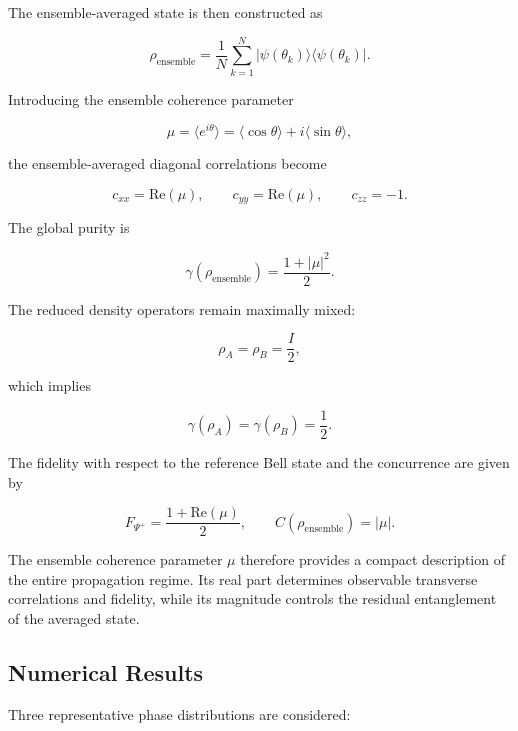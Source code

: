 The ensemble-averaged state is then constructed as

\begin{equation}
\rho_{\mathrm{ensemble}}
=
\frac{1}{N}
\sum_{k=1}^{N}
|\psi(\theta_k)\rangle
\langle\psi(\theta_k)|.
\label{eq:random_phase_ensemble_density_operator}
\end{equation}

Introducing the ensemble coherence parameter

\begin{equation}
\mu
=
\langle e^{i\theta} \rangle
=
\langle \cos\theta \rangle
+
i
\langle \sin\theta \rangle,
\label{eq:ensemble_coherence_parameter}
\end{equation}

the ensemble-averaged diagonal correlations become

\[
c_{xx}
=
\mathrm{Re}(\mu),
\qquad
c_{yy}
=
\mathrm{Re}(\mu),
\qquad
c_{zz}
=
-1.
\]

The global purity is

\[
\gamma(\rho_{\mathrm{ensemble}})
=
\frac{1 + |\mu|^2}{2}.
\]

The reduced density operators remain maximally mixed:

\[
\rho_A
=
\rho_B
=
\frac{I}{2},
\]

which implies

\[
\gamma(\rho_A)
=
\gamma(\rho_B)
=
\frac{1}{2}.
\]

The fidelity with respect to the reference Bell state and the concurrence are given by

\[
F_{\Psi^+}
=
\frac{1 + \mathrm{Re}(\mu)}{2},
\qquad
C(\rho_{\mathrm{ensemble}})
=
|\mu|.
\]

\medskip

The ensemble coherence parameter \( \mu \) therefore provides a compact description of the entire propagation regime. Its real part determines observable transverse correlations and fidelity, while its magnitude controls the residual entanglement of the averaged state.


\subsection{Numerical Results}

Three representative phase distributions are considered:

